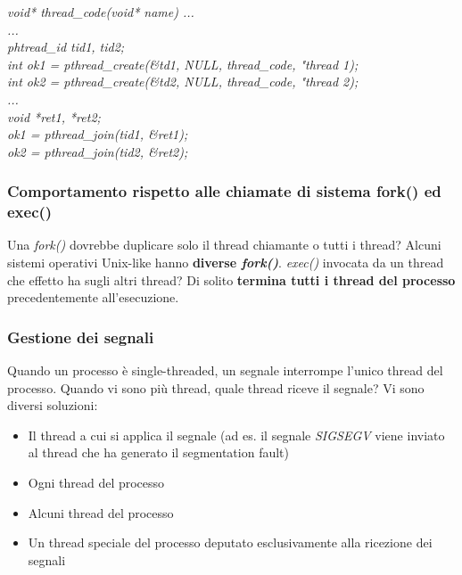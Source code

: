 \documentclass[12pt]{article}
\begin{document}
\begin{center}
    \textit{void* thread\_code(void* name) {...}} \\
    \textit{...} \\
    \textit{phtread\_id tid1, tid2;} \\
    \textit{int ok1 = pthread\_create(\textnormal{\&}td1, NULL, thread\_code, "thread 1);} \\
    \textit{int ok2 = pthread\_create(\textnormal{\&}td2, NULL, thread\_code, "thread 2);} \\
    \textit{...} \\
    \textit{void *ret1, *ret2;} \\
    \textit{ok1 = pthread\_join(tid1, \textnormal{\&}ret1);} \\
    \textit{ok2 = pthread\_join(tid2, \textnormal{\&}ret2);}
\end{center}
\newpage
\subsubsection{Comportamento rispetto alle chiamate di sistema fork() ed exec()}
Una \textit{fork()} dovrebbe duplicare solo il thread chiamante o tutti i thread? Alcuni sistemi operativi Unix-like hanno
\textbf{diverse \textit{fork()}}.\newline
\textit{exec()} invocata da un thread che effetto ha sugli altri thread? Di solito \textbf{termina tutti i thread del processo} precedentemente
all'esecuzione.
\subsubsection{Gestione dei segnali}
Quando un processo è single-threaded, un segnale interrompe l'unico thread del processo.
Quando vi sono più thread, quale thread riceve il segnale? Vi sono diversi soluzioni:
\begin{itemize}
    \item Il thread a cui si applica il segnale (ad es. il segnale \textit{SIGSEGV} viene inviato al thread che ha generato il segmentation fault)
    \item Ogni thread del processo
    \item Alcuni thread del processo
    \item Un thread speciale del processo deputato esclusivamente alla ricezione dei segnali
\end{itemize}
\end{document}
